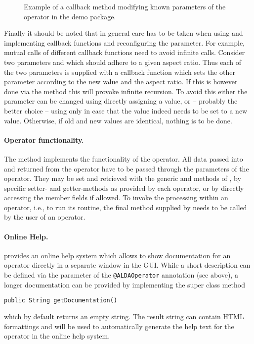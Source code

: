 \begin{figure}[h]

\caption{\label{exa:callback-method}Example of a callback method modifying known parameters of the operator   in the demo package.}
\end{figure}

Finally it should be noted that in general care has to be taken when using and implementing callback functions
and reconfiguring the parameter.
For example, mutual calls of different callback functions need to avoid infinite calls.
Consider two parameters  and  which should adhere to a given aspect ratio.
Thus each of the two parameters is supplied with a callback function which sets the 
other parameter according to the new value and the aspect ratio.
If this is however done via the  method this will provoke infinite recursion.
To avoid this either the parameter can be changed using directly assigning a value,
or -- probably the better choice -- using   only in case that the value indeed needs to be set to a new value.
Otherwise, if old and new values are identical, nothing is to be done.

\paragraph{Operator functionality.}
The method  implements the functionality of the operator. All data
passed into and returned from the operator have to be passed through the parameters of the operator.
They may be set and retrieved with the generic
 and  methods
of , by specific setter- and getter-methods as provided by
each operator, or by
directly accessing the member fields if allowed.
To invoke the processing within an operator, i.e., to run its 
routine, the final method  supplied by  needs to be called by the user of an operator.

\paragraph{Online Help.}
\label{para:online-help}
\alida provides an online help system which allows to show documentation for an operator directly in a separate
window in the GUI. While a short description can be defined via the parameter
 of the \texttt{@ALDAOperator} annotation (see above), a longer documentation can be provided
by implementing the super class method\\
\begin{lstlisting}[xrightmargin=.00\textwidth, xleftmargin=.0\textwidth,frame=single,numbers=none]
  public String getDocumentation()
\end{lstlisting} 
which by default returns an empty string. The result string can contain HTML formattings and will be
used to automatically generate the help text for the operator in the online help system.


